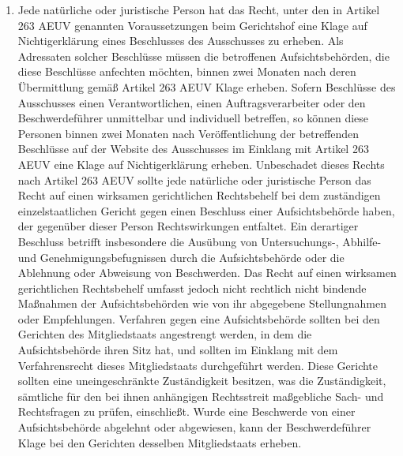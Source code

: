 \begin{enumerate}

   \item Jede natürliche oder juristische Person hat das Recht, unter den in Artikel 263 AEUV genannten Voraussetzungen
    beim Gerichtshof eine Klage auf Nichtigerklärung eines Beschlusses des Ausschusses zu erheben. Als Adressaten
    solcher Beschlüsse müssen die betroffenen Aufsichtsbehörden, die diese Beschlüsse anfechten möchten, binnen zwei
    Monaten nach deren Übermittlung gemäß Artikel 263 AEUV Klage erheben. Sofern Beschlüsse des Ausschusses einen
    Verantwortlichen, einen Auftragsverarbeiter oder den Beschwerdeführer unmittelbar und individuell betreffen, so
    können diese Personen binnen zwei Monaten nach Veröffentlichung der betreffenden Beschlüsse auf der Website des
    Ausschusses im Einklang mit Artikel 263 AEUV eine Klage auf Nichtigerklärung erheben. Unbeschadet dieses Rechts
    nach Artikel 263 AEUV sollte jede natürliche oder juristische Person das Recht auf einen wirksamen gerichtlichen
    Rechtsbehelf bei dem zuständigen einzelstaatlichen Gericht gegen einen Beschluss einer Aufsichtsbehörde haben, der
    gegenüber dieser Person Rechtswirkungen entfaltet. Ein derartiger Beschluss betrifft insbesondere die Ausübung von
    Untersuchungs-, Abhilfe- und Genehmigungsbefugnissen durch die Aufsichtsbehörde oder die Ablehnung oder Abweisung
    von Beschwerden. Das Recht auf einen wirksamen gerichtlichen Rechtsbehelf umfasst jedoch nicht rechtlich nicht
    bindende Maßnahmen der Aufsichtsbehörden wie von ihr abgegebene Stellungnahmen oder Empfehlungen. Verfahren gegen
    eine Aufsichtsbehörde sollten bei den Gerichten des Mitgliedstaats angestrengt werden, in dem die Aufsichtsbehörde
    ihren Sitz hat, und sollten im Einklang mit dem Verfahrensrecht dieses Mitgliedstaats durchgeführt werden. Diese
    Gerichte sollten eine uneingeschränkte Zuständigkeit besitzen, was die Zuständigkeit, sämtliche für den bei ihnen
    anhängigen Rechtsstreit maßgebliche Sach- und Rechtsfragen zu prüfen, einschließt. Wurde eine Beschwerde von einer
    Aufsichtsbehörde abgelehnt oder abgewiesen, kann der Beschwerdeführer Klage bei den Gerichten desselben
    Mitgliedstaats erheben. 


\end{enumerate}

